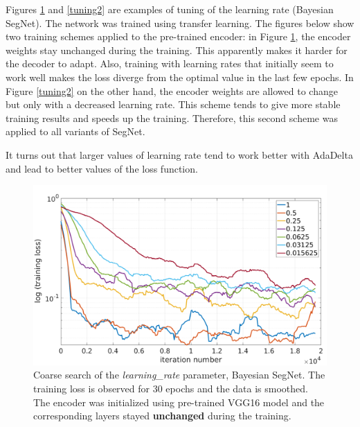 Figures \ref{tuning1} and \ref{tuning2} are examples of tuning of the learning rate (Bayesian SegNet). The network was trained using transfer learning. The figures below show two training schemes applied to the pre-trained encoder: in Figure \ref{tuning1}, the encoder weights stay unchanged during the training. This apparently makes it harder for the decoder to adapt. Also, training with learning rates that initially seem to work well makes the loss diverge from the optimal value in the last few epochs. In Figure \ref{tuning2} on the other hand, the encoder weights are allowed to change but only with a decreased learning rate. This scheme tends to give more stable training results and speeds up the training. Therefore, this second scheme was applied to all variants of SegNet.  

It turns out that larger values of learning rate tend to work better with AdaDelta and lead to better values of the loss function. 

\newpage

\begin{figure}[h]
	\begin{center}
		\includegraphics*[width=14cm, keepaspectratio]{obr/bayes_full_rough.png}
	\end{center}
	\vspace{5mm}
	\caption{Coarse search of the \textit{learning\_rate} parameter, Bayesian SegNet. The training loss is observed for 30 epochs and the data is smoothed. The encoder was initialized using pre-trained VGG16 model and the corresponding layers stayed \textbf{unchanged} during the training.} 
	\label{tuning1}
\end{figure}

